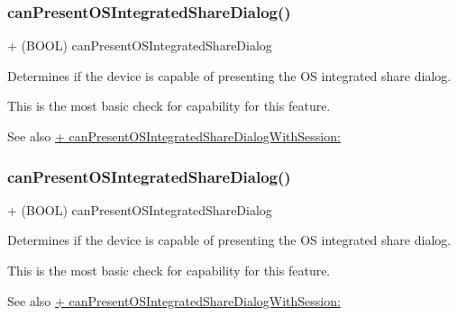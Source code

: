 \subsubsection{\texorpdfstring{can\+Present\+O\+S\+Integrated\+Share\+Dialog()}{canPresentOSIntegratedShareDialog()}\hspace{0.1cm}{\footnotesize\ttfamily [1/5]}}
{\footnotesize\ttfamily + (B\+O\+OL) can\+Present\+O\+S\+Integrated\+Share\+Dialog \begin{DoxyParamCaption}{ }\end{DoxyParamCaption}}

Determines if the device is capable of presenting the OS integrated share dialog.

This is the most basic check for capability for this feature.

\begin{DoxySeeAlso}{See also}
\hyperlink{interfaceFBDialogs_a268b4ee8ee491e006770a51cefa36eeb}{+ can\+Present\+O\+S\+Integrated\+Share\+Dialog\+With\+Session\+:} 
\end{DoxySeeAlso}
\mbox{\label{interfaceFBDialogs_a4239a93d5d1b150b93cf589bca6f46e1}} 
\subsubsection{\texorpdfstring{can\+Present\+O\+S\+Integrated\+Share\+Dialog()}{canPresentOSIntegratedShareDialog()}\hspace{0.1cm}{\footnotesize\ttfamily [2/5]}}
{\footnotesize\ttfamily + (B\+O\+OL) can\+Present\+O\+S\+Integrated\+Share\+Dialog \begin{DoxyParamCaption}{ }\end{DoxyParamCaption}}

Determines if the device is capable of presenting the OS integrated share dialog.

This is the most basic check for capability for this feature.

\begin{DoxySeeAlso}{See also}
\hyperlink{interfaceFBDialogs_a268b4ee8ee491e006770a51cefa36eeb}{+ can\+Present\+O\+S\+Integrated\+Share\+Dialog\+With\+Session\+:} 
\end{DoxySeeAlso}
\mbox{\label{interfaceFBDialogs_a4239a93d5d1b150b93cf589bca6f46e1}} 
